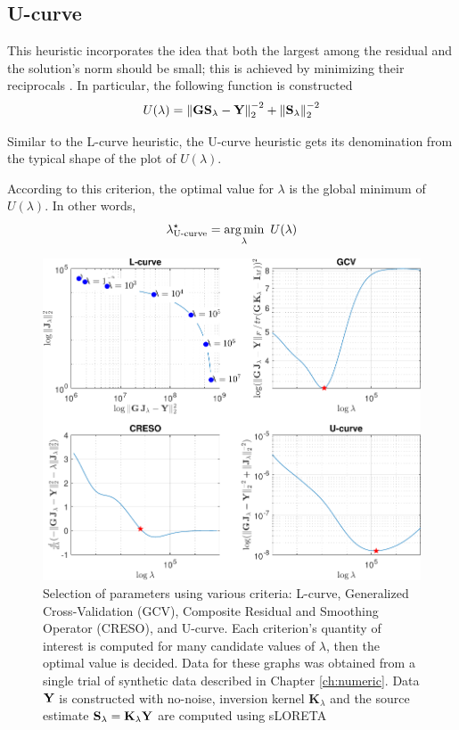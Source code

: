 \subsection{U-curve}

This heuristic incorporates the idea that both the largest among the residual and the solution's norm should be small; this is achieved by minimizing their reciprocals \cite{Ucurve}.
%
In particular, the following function is constructed
\begin{equation}
U(\lambda) = 
\left\lVert \mathbf{G}\mathbf{S}_\lambda - \mathbf{Y} \right\rVert_2^{-2} + \left\lVert \mathbf{S}_\lambda \right\rVert_2^{-2}
\end{equation}

Similar to the L-curve heuristic, the U-curve heuristic gets its denomination from the typical shape of the plot of $U(\lambda)$.

According to this criterion, the optimal value for $\lambda$ is the global minimum of $U(\lambda)$.
%
In other words,
\begin{equation}
    \lambda^\star_\text{U-curve} = 
    \operatorname*{arg\,min}_\lambda\,\, U(\lambda)
\end{equation}

\begin{figure}
\centering
\includegraphics[width=1\linewidth]{./img_MATLAB/ParTuning_sLORETA}
\caption{Selection of parameters using various criteria: L-curve, Generalized Cross-Validation (GCV), Composite Residual and Smoothing Operator (CRESO), and U-curve. 
%
Each criterion's quantity of interest is computed for many candidate values of $\lambda$, then the optimal value is decided.
%
Data for these graphs was obtained from a single trial of synthetic data described in Chapter \ref{ch:numeric}. Data $\mathbf{Y}$ is constructed with no-noise, inversion kernel $\mathbf{K}_\lambda$ and the source estimate $\mathbf{S}_\lambda = \mathbf{K}_\lambda \mathbf{Y}$ are computed using sLORETA
}
\label{fig:tuning}
\end{figure}

